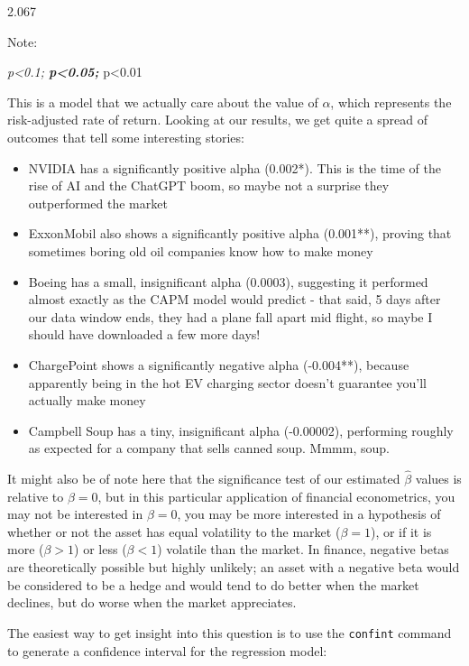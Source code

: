 \documentclass[
  letterpaper,
]{book}
\providecommand{\tightlist}{%
  \setlength{\itemsep}{0pt}\setlength{\parskip}{0pt}}\usepackage{longtable,booktabs,array}
\begin{document}
2.067

Note:

\emph{p\textless0.1; \textbf{p\textless0.05; }}p\textless0.01

This is a model that we actually care about the value of \(\alpha\),
which represents the risk-adjusted rate of return. Looking at our
results, we get quite a spread of outcomes that tell some interesting
stories:

\begin{itemize}
\tightlist
\item
  NVIDIA has a significantly positive alpha (0.002*). This is the time
  of the rise of AI and the ChatGPT boom, so maybe not a surprise they
  outperformed the market
\item
  ExxonMobil also shows a significantly positive alpha (0.001**),
  proving that sometimes boring old oil companies know how to make money
\item
  Boeing has a small, insignificant alpha (0.0003), suggesting it
  performed almost exactly as the CAPM model would predict - that said,
  5 days after our data window ends, they had a plane fall apart mid
  flight, so maybe I should have downloaded a few more days!
\item
  ChargePoint shows a significantly negative alpha (-0.004**), because
  apparently being in the hot EV charging sector doesn't guarantee
  you'll actually make money
\item
  Campbell Soup has a tiny, insignificant alpha (-0.00002), performing
  roughly as expected for a company that sells canned soup. Mmmm, soup.
\end{itemize}

It might also be of note here that the significance test of our
estimated \(\hat{\beta}\) values is relative to \(\beta = 0\), but in
this particular application of financial econometrics, you may not be
interested in \(\beta = 0\), you may be more interested in a hypothesis
of whether or not the asset has equal volatility to the market
(\(\beta=1\)), or if it is more (\(\beta>1\)) or less (\(\beta<1\))
volatile than the market. In finance, negative betas are theoretically
possible but highly unlikely; an asset with a negative beta would be
considered to be a hedge and would tend to do better when the market
declines, but do worse when the market appreciates.

The easiest way to get insight into this question is to use the
\texttt{confint} command to generate a confidence interval for the
regression model:
\end{document}
